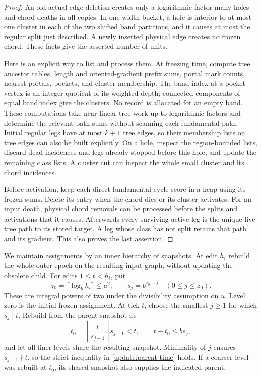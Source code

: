 \begin{proof}
An old actual-edge deletion creates only a logarithmic factor many
holes and chord deaths in all copies.  In one width bucket, a hole is
interior to at most one cluster in each of the two shifted band
partitions, and it causes at most the regular split just described.
A newly inserted physical edge creates no frozen chord.  These facts
give the asserted number of units.

Here is an explicit way to list and process them.  At freezing time,
compute tree ancestor tables, length and oriented-gradient prefix sums,
portal mark counts, nearest portals, pockets, and cluster membership.
The band index at a pocket vertex is an integer quotient of its weighted
depth; connected components of equal band index give the clusters.
No record is allocated for an empty band.  These computations take
near-linear tree work up to logarithmic factors and determine the
relevant path sums without scanning each fundamental path.  Initial
regular legs have at most $k+1$ tree edges, so their membership lists on
tree edges can also be built explicitly.  On a hole, inspect the
region-bounded lists, discard dead incidences and legs already stopped
before this hole, and update the remaining class lists.  A cluster cut
can inspect the whole small cluster and its chord incidences.

Before activation, keep each direct fundamental-cycle score in a heap
using its frozen sums.  Delete its entry when the chord dies or its
cluster activates.  For an input death, physical chord removals can be
processed before the splits and activations that it causes.  Afterwards
every surviving active leg is the unique live tree path to its stored
target.  A leg whose class has not split retains that path and its
gradient.  This also proves the last assertion.
\end{proof}

We maintain assignments by an inner hierarchy of snapshots.  At edit
$h_i$ rebuild the whole outer epoch on the resulting input graph,
without updating the obsolete child.  For edits $1\le t<h_i$, put
\begin{equation}
 z_0=\lceil\log_b h_i\rceil\le a^2,
 \qquad s_j=b^{z_0-j}\quad(0\le j\le z_0).
 \label{update:periods}
\end{equation}
These are integral powers of two under the divisibility assumption on
$u$.  Level zero is the initial frozen assignment.  At tick $t$, choose
the smallest $j\ge1$ for which $s_j\mid t$.  Rebuild from the parent
snapshot at
\begin{equation}
 t_0=\left\lfloor\frac{t}{s_{j-1}}\right\rfloor s_{j-1}<t,
 \qquad t-t_0\le b s_j,
 \label{update:parent-time}
\end{equation}
and let all finer levels share the resulting snapshot.  Minimality of
$j$ ensures $s_{j-1}\nmid t$, so the strict inequality in
\eqref{update:parent-time} holds.  If a coarser level was rebuilt at
$t_0$, its shared snapshot also supplies the indicated parent.

